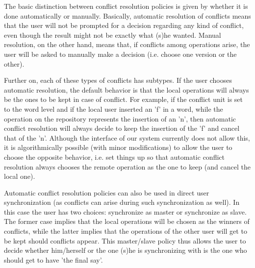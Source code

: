 The basic distinction between conflict resolution policies is given by whether it is done automatically
or manually. Basically, automatic resolution of conflicts means that the user will not be prompted for
a decision regarding any kind of conflict, even though the result might not be exactly what (s)he wanted.
Manual resolution, on the other hand, means that, if conflicts among operations arise, the user will be
asked to manually make a decision (i.e. choose one version or the other).

Further on, each of these types of conflicts has subtypes. If the user chooses automatic resolution, the
default behavior is that the local operations will always be the ones to be kept in case of conflict.
For example, if the conflict unit is set to the word level and if the local user inserted an 'f' in a
word, while the operation on the repository represents the insertion of an 'n', then automatic conflict
resolution will always decide to keep the insertion of the 'f' and cancel that of the 'n'. Although
the interface of our system currently does not allow this, it is algorithmically possible (with minor
modifications) to allow the user to choose the opposite behavior, i.e. set things up so that automatic
conflict resolution always chooses the remote operation as the one to keep (and cancel the local one).

Automatic conflict resolution policies can also be used in direct user synchronization (as conflicts can
arise during such synchronization as well). In this case the user has two choices: synchronize as master
or synchronize as slave. The former case implies that the local operations will be chosen as the winners
of conflicts, while the latter implies that the operations of the other user will get to be kept should
conflicts appear. This master/slave policy thus allows the user to decide whether him/herself or the one
(s)he is synchronizing with is the one who should get to have 'the final say'.

